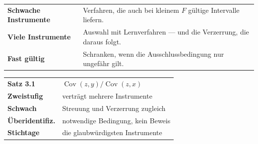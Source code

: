 \begin{forschung}
\begin{center}
{\small
\renewcommand{\arraystretch}{1.45}
\begin{tabular}{@{}P{3.2cm}P{5.0cm}@{}}
\toprule
\textbf{Schwache Instrumente} & Verfahren, die auch bei kleinem $F$ gültige Intervalle liefern.\\
\textbf{Viele Instrumente} & Auswahl mit Lernverfahren --- und die Verzerrung, die daraus folgt.\\
\textbf{Fast gültig} & Schranken, wenn die Ausschlussbedingung nur ungefähr gilt.\\
\bottomrule
\end{tabular}}
\end{center}

\begin{center}
\begin{minipage}{0.88\textwidth}
\end{minipage}
\end{center}
\end{forschung}

\begin{merksatz}
\begin{center}
\renewcommand{\arraystretch}{1.5}
\begin{tabular}{@{}P{3.0cm}P{5.6cm}@{}}
\toprule
\textbf{Satz 3.1} & $\operatorname{Cov}(z,y)/\operatorname{Cov}(z,x)$\\
\textbf{Zweistufig} & verträgt mehrere Instrumente\\
\textbf{Schwach} & Streuung und Verzerrung zugleich\\
\textbf{Überidentifiz.} & notwendige Bedingung, kein Beweis\\
\textbf{Stichtage} & die glaubwürdigsten Instrumente\\
\bottomrule
\end{tabular}
\end{center}

\begin{center}
\begin{minipage}{0.88\textwidth}
\end{minipage}
\end{center}
\end{merksatz}
